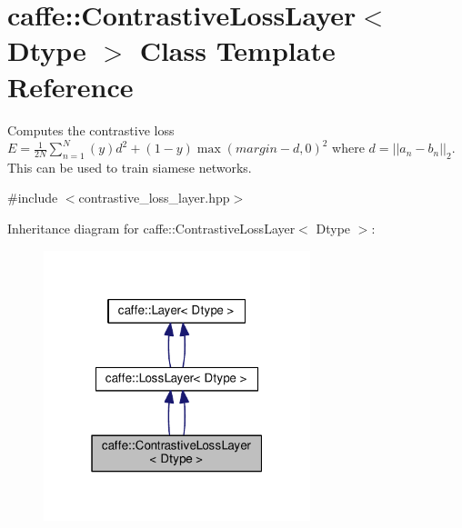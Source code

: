 \hypertarget{classcaffe_1_1_contrastive_loss_layer}{}\section{caffe\+:\+:Contrastive\+Loss\+Layer$<$ Dtype $>$ Class Template Reference}
\label{classcaffe_1_1_contrastive_loss_layer}


Computes the contrastive loss $ E = \frac{1}{2N} \sum\limits_{n=1}^N \left(y\right) d^2 + \left(1-y\right) \max \left(margin-d, 0\right)^2 $ where $ d = \left| \left| a_n - b_n \right| \right|_2 $. This can be used to train siamese networks.  




{\ttfamily \#include $<$contrastive\+\_\+loss\+\_\+layer.\+hpp$>$}



Inheritance diagram for caffe\+:\+:Contrastive\+Loss\+Layer$<$ Dtype $>$\+:
\nopagebreak
\begin{figure}[H]
\begin{center}
\leavevmode
\includegraphics[width=220pt]{classcaffe_1_1_contrastive_loss_layer__inherit__graph}
\end{center}
\end{figure}

